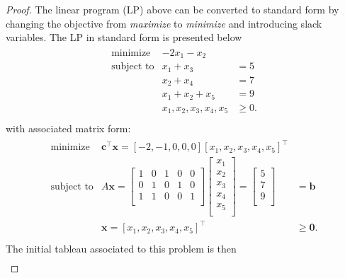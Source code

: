 \documentclass[12pt]{article}
\theoremstyle{definition}
\newcommand{\vect}[1]{\boldsymbol{#1}}
\begin{document}
\begin{proof}
  The linear program (LP) above can be converted to standard form by changing the
  objective from \textit{maximize} to \textit{minimize} and introducing
  slack variables. The LP in standard form is presented below
  \begin{align*}
    \begin{array}{rrl}
      \text{minimize} & -2x_1 - x_2 & \\
      \text{subject to} & x_1 + x_3 &= 5 \\
      & x_2 + x_4 &= 7 \\
      & x_1 + x_2 + x_5 &= 9 \\
      & x_1, x_2, x_3, x_4, x_5 &\geq 0.  \\
    \end{array}
  \end{align*}
  with associated matrix form:
  \begin{align*}
    \begin{array}{rrl}
      \text{minimize} & \vect{c}^\intercal\vect{x} = [-2, -1, 0, 0, 0][x_1, x_2, x_3, x_4, x_5]^\intercal & \\
      \text{subject to} & A\vect{x} =
      \begin{bmatrix}
        1 & 0 & 1 & 0 & 0 \\
        0 & 1 & 0 & 1 & 0 \\
        1 & 1 & 0 & 0 & 1 \\
      \end{bmatrix}
      \begin{bmatrix}
        x_1 \\
        x_2 \\
        x_3 \\
        x_4 \\
        x_5\\
      \end{bmatrix}
      =
      \begin{bmatrix}
        5 \\
        7 \\
        9 \\
      \end{bmatrix}
      &= \vect{b}
      \\
      &\vect{x} = [x_1, x_2, x_3, x_4, x_5]^\intercal &\geq \vect{0}.\\
    \end{array}
  \end{align*}
  The initial tableau associated to this problem is then
  \begin{align*}

\end{align*}
\end{proof}
\end{document}
